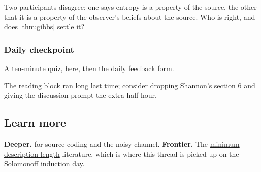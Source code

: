 \documentclass[11pt]{article}
\begin{document}
\begin{callout}
Two participants disagree: one says entropy is a property of the source, the
other that it is a property of the observer's beliefs about the source. Who
is right, and does \cref{thm:gibbs} settle it?
\end{callout}

\subsubsection{Daily checkpoint}
\label{sec:checkpoint}

A ten-minute quiz, \href{https://example.com/quiz}{here}, then the daily
feedback form.

\begin{teachingnote}
The reading block ran long last time; consider dropping Shannon's section 6
and giving the discussion prompt the extra half hour.
\end{teachingnote}

\subsection{Learn more}
\label{sec:learn-more}

\textbf{Deeper.} \cite[ch.~5--6]{MacKay:03} for source coding and the noisy
channel. \textbf{Frontier.} The
\href{https://en.wikipedia.org/wiki/Minimum_description_length}{minimum description
length} literature, which is where this thread is picked up on the
Solomonoff induction day.
\end{document}
